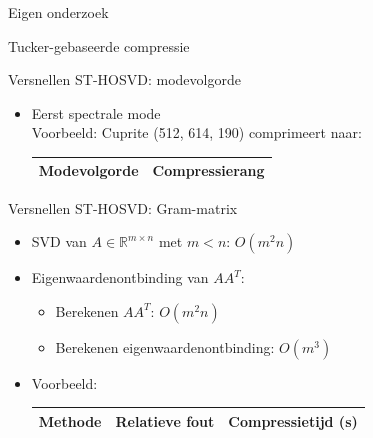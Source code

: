\documentclass[t,12pt,dutch
\ifx\beamermode\undefined\else,\beamermode\fi
]{beamer}
\begin{document}
\begin{frame}{}
\begin{center}
\vspace*{\fill}
\vspace*{\fill}
\Huge
Eigen onderzoek
\normalsize
\vspace*{\fill}
\end{center}
\end{frame}

\begin{frame}{}
\begin{center}
\vspace*{\fill}
\vspace*{\fill}
\Huge
Tucker-gebaseerde compressie
\normalsize
\vspace*{\fill}
\end{center}
\end{frame}

\begin{frame}{Versnellen ST-HOSVD: modevolgorde}

\begin{itemize}
\item Eerst spectrale mode\\
Voorbeeld: Cuprite (512, 614, 190) comprimeert naar:
\begin{table}[H]
\centering
\begin{tabular}{|l|l|}
\hline
Modevolgorde & Compressierang \\ \hline

\end{tabular}
\end{table}
\end{itemize}
\end{frame}

\begin{frame}{Versnellen ST-HOSVD: Gram-matrix}

\begin{itemize}

\item SVD van $A \in \mathbb{R}^{m \times n}$ met $m < n$: $O(m^2 n)$

\item Eigenwaardenontbinding van $A A^T$:
\begin{itemize}
\item Berekenen $A A^T$: $O(m^2 n)$
\item Berekenen eigenwaardenontbinding: $O(m^3)$
\end{itemize}

\item Voorbeeld:
\begin{table}[H]
\centering
\begin{tabular}{|l|l|l|}
\hline
Methode & Relatieve fout & Compressietijd (s)\\ \hline

\end{tabular}
\end{table}

\end{itemize}
\end{frame}
\end{document}
